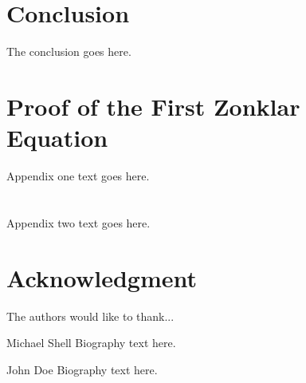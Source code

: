 \documentclass[journal]{IEEEtran}
\begin{document}
\section{Conclusion}
The conclusion goes here.

\appendices
\section{Proof of the First Zonklar Equation}
Appendix one text goes here.

\section{}
Appendix two text goes here.

\section*{Acknowledgment}

The authors would like to thank...

\ifCLASSOPTIONcaptionsoff
  \newpage
\fi

%
%

\begin{IEEEbiography}{Michael Shell}
Biography text here.
\end{IEEEbiography}

\begin{IEEEbiographynophoto}{John Doe}
Biography text here.
\end{IEEEbiographynophoto}
\end{document}
